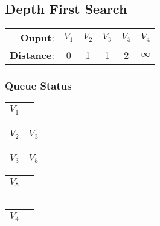 \documentclass{article}
\begin{document}
\subsection{Depth First Search}
\begin{center}
\begin{tabular}{rccccc}
    \textbf{Ouput}:    & $V_1$ & $V_2$ & $V_3$ & $V_5$ & $V_4$\\
    \textbf{Distance}: & 0 & 1 & 1 & 2 & $\infty$
\end{tabular}
\end{center}

\subsubsection{Queue Status}
\begin{tabular}{|ll}
    \hline
    $V_1$ & \\
    \hline
\end{tabular}

\noindent
\begin{tabular}{|lll}
    \hline
    $V_2$ & $V_3$ \\
    \hline
\end{tabular}

\noindent
\begin{tabular}{|lll}
    \hline
    $V_3$ & $V_5$ \\
    \hline
\end{tabular}

\noindent
\begin{tabular}{|ll}
    \hline
    $V_5$ & \\
    \hline
\end{tabular}

\noindent
\begin{tabular}{|ll}
    \hline
     & \\
    \hline
\end{tabular}

\noindent
\begin{tabular}{|ll}
    \hline
     $V_4$ & \\
    \hline
\end{tabular}

\noindent
\begin{tabular}{|ll}
    \hline
     & \\
    \hline
\end{tabular}
\end{document}
